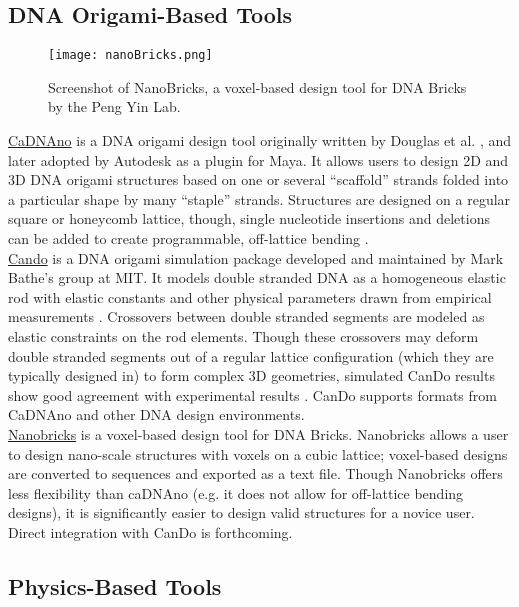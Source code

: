 {\subsection{DNA Origami-Based Tools}

\begin{figure}
  \texttt{[image: nanoBricks.png]}
  \caption{Screenshot of NanoBricks, a voxel-based design tool for DNA Bricks by the Peng Yin Lab.}
  \label{fig:nanoBricks}
\end{figure}

\href{http://cadnano.org/}{CaDNAno} is a DNA origami design tool originally written by Douglas et al. \cite{Douglas2009}, and later adopted by Autodesk as a plugin for Maya.  It allows users to design 2D and 3D DNA origami structures based on one or several ``scaffold'' strands folded into a particular shape by many ``staple'' strands.  Structures are designed on a regular square or honeycomb lattice, though, single nucleotide insertions and deletions can be added to create programmable, off-lattice bending \cite{Dietz2009} \cite{Kim2012}.\\

\href{http://cando-dna-origami.org/}{Cando} is a DNA origami simulation package developed and maintained by Mark Bathe's group at MIT.  It models double stranded DNA as a homogeneous elastic rod with elastic constants and other physical parameters drawn from empirical measurements \cite{Peters2014}.  Crossovers between double stranded segments are modeled as elastic constraints on the rod elements.  Though these crossovers may deform double stranded segments out of a regular lattice configuration (which they are typically designed in) to form complex 3D geometries, simulated CanDo results show good agreement with experimental results \cite{Kim2012a}.  CanDo supports formats from CaDNAno and other DNA design environments.
\\

\href{http://yin.hms.harvard.edu/bricks/try/}{Nanobricks} is a voxel-based design tool for DNA Bricks.  Nanobricks allows a user to design nano-scale structures with voxels on a cubic lattice; voxel-based designs are converted to sequences and exported as a text file.  Though Nanobricks offers less flexibility than caDNAno (e.g. it does not allow for off-lattice bending designs), it is significantly easier to design valid structures for a novice user.  Direct integration with CanDo is forthcoming.
\\

\subsection{Physics-Based Tools}

}
